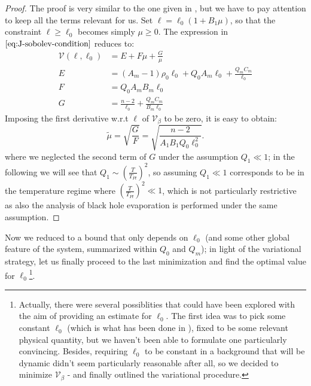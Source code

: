 \begin{proof}
    The proof is very similar to the one given in \cite{fewster2020new}, but we have to pay attention to keep all the terms relevant for us.
	\noindent
    Set \(\ell = \ell_0\left(1 + B_1\mu\right)\), so that the constraint \(\ell\ge\ell_0\) becomes simply \(\mu \ge 0\).
	The expression in \(\eqref{eq:J-sobolev-condition}\) reduces to:
    \begin{align*}
        \mathcal{V}(\ell, \ell_0) &= E + F\mu + \frac{G}{\mu} \\
        E &= (A_m - 1)\rho_0\ell_0 + Q_0A_m\ell_0 + \frac{Q_mC_m}{\ell_0}\\
        F &= Q_0A_mB_m\ell_0 \\
        G &= \frac{n- 2}{\ell_0} + \frac{Q_mC_m}{B_m\ell_0}
    \end{align*}
    Imposing the first derivative w.r.t \(\ell\) of \(\mathcal{V}_{\beta}\) to be zero, it is easy to obtain:
    \[
    \tilde{\mu} = \sqrt{\frac{G}{F}} =  \sqrt{\frac{n - 2}{A_1B_1Q_0\ell_0^2}}.
    \]
	where we neglected the second term of \(G\) under the assumption \(Q_1 \ll 1\); in the following we will see that \(Q_1 \sim \left(\frac{T}{T_{Pl}}\right)^2\), so assuming \(Q_1 \ll 1\) corresponds to be in the temperature regime where \(\left(\frac{T}{T_{Pl}}\right)^2 \ll 1\), which is not particularly restrictive as also the analysis of black hole evaporation is performed under the same assumption.
\end{proof}

Now we reduced to a bound that only depends on \(\ell_0\) (and some other global feature of the system, summarized within \(Q_0\) and \(Q_m\)); in light of the variational strategy, let us finally proceed to the last minimization and find the optimal value for \(\ell_0\)\footnote{Actually, there were several possiblities that could have been explored with the aim of providing an estimate for \(\ell_0\). The first idea was to pick some constant \(\ell_0\) (which is what has been done in \cite{fewster2020new}), fixed to be some relevant physical quantity, but we haven't been able to formulate one particularly convincing. Besides, requiring \(\ell_0\) to be constant in a background that will be dynamic didn't seem particularly reasonable after all, so we decided to minimize \(\mathcal{V}_{\beta}\) - and finally outlined the variational procedure.}. 

